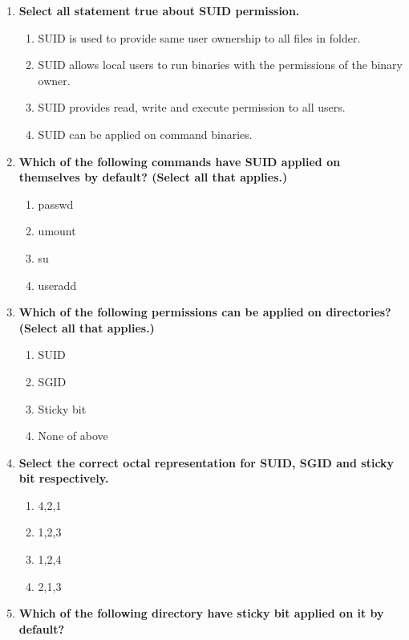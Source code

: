 \begin{flushleft}
\begin{enumerate}
		\item \textbf{Select all statement true about SUID permission.}
		\begin{enumerate}[label=(\alph*)]
			\item SUID is used to provide same user ownership to all files in folder.
			\item SUID allows local users to run binaries with the permissions of the binary owner. %
			\item SUID provides read, write and execute permission to all users.
			\item SUID can be applied on command binaries. %
		\end{enumerate}
		\bigskip
		\bigskip
		\newpage
		\item \textbf{Which of the following commands have SUID applied on themselves by default? (Select all that applies.)}
		\begin{enumerate}[label=(\alph*)]
			\item passwd    %
			\item umount    %
			\item su       %
			\item useradd
		\end{enumerate}
		\bigskip
		\bigskip
		\item \textbf{Which of the following permissions can be applied on directories? (Select all that applies.)}
		\begin{enumerate}[label=(\alph*)]
			\item SUID
			\item SGID                 %
			\item Sticky bit          %
			\item None of above
		\end{enumerate}	
		\bigskip
		\bigskip
		\item \textbf{Select the correct octal representation for SUID, SGID and sticky bit respectively.}
		\begin{enumerate}[label=(\alph*)]
			\item 4,2,1    %
			\item 1,2,3
			\item 1,2,4
			\item 2,1,3
		\end{enumerate}
		\bigskip
		\bigskip
		\item \textbf{Which of the following directory have sticky bit applied on it by default?}
		\begin{enumerate}[label=(\alph*)]

\end{enumerate}
\end{enumerate}
\end{flushleft}
